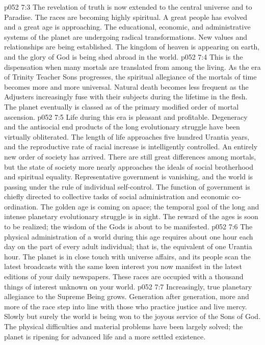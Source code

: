 \pc \vs p052 7:3 The revelation of truth is now extended to the central universe and to Paradise. The races are becoming highly spiritual. A great people has evolved and a great age is approaching. The educational, economic, and administrative systems of the planet are undergoing radical transformations. New values and relationships are being established. The kingdom of heaven is appearing on earth, and the glory of God is being shed abroad in the world.
\vs p052 7:4 This is the dispensation when many mortals are translated from among the living. As the era of Trinity Teacher Sons progresses, the spiritual allegiance of the mortals of time becomes more and more universal. Natural death becomes less frequent as the Adjusters increasingly fuse with their subjects during the lifetime in the flesh. The planet eventually is classed as of the primary modified order of mortal ascension.\plusone
\pc \vs p052 7:5 Life during this era is pleasant and profitable. Degeneracy and the antisocial end products of the long evolutionary struggle have been virtually obliterated. The length of life approaches five hundred Urantia years, and the reproductive rate of racial increase is intelligently controlled. An entirely new order of society has arrived. There are still great differences among mortals, but the state of society more nearly approaches the ideals of social brotherhood and spiritual equality. Representative government is vanishing, and the world is passing under the rule of individual self\hyp{}control. The function of government is chiefly directed to collective tasks of social administration and economic co\hyp{}ordination. The golden age is coming on apace; the temporal goal of the long and intense planetary evolutionary struggle is in sight. The reward of the ages is soon to be realized; the wisdom of the Gods is about to be manifested.
\vs p052 7:6 The physical administration of a world during this age requires about one hour each day on the part of every adult individual; that is, the equivalent of one Urantia hour. The planet is in close touch with universe affairs, and its people scan the latest broadcasts with the same keen interest you now manifest in the latest editions of your daily newspapers. These races are occupied with a thousand things of interest unknown on your world.
\pc \vs p052 7:7 Increasingly, true planetary allegiance to the Supreme Being grows. Generation after generation, more and more of the race step into line with those who practice justice and live mercy. Slowly but surely the world is being won to the joyous service of the Sons of God. The physical difficulties and material problems have been largely solved; the planet is ripening for advanced life and a more settled existence.
